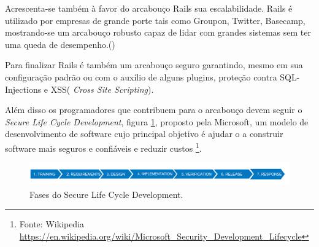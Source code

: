 \par Acrescenta-se também à favor do arcabouço Rails sua escalabilidade. Rails é utilizado por empresas de grande porte tais como Groupon, Twitter, Basecamp, mostrando-se um arcabouço robusto capaz de lidar com grandes sistemas sem ter uma queda de desempenho.(\cite{lilia:16})
\par Para finalizar Rails é também um arcabouço seguro garantindo, mesmo em sua configuração padrão ou com o auxílio de alguns plugins, proteção contra SQL-Injections e XSS( \emph{Cross Site Scripting}).
\par Além disso os programadores que contribuem para o arcabouço devem seguir o \emph{Secure Life Cycle Development}, figura \ref{fig:security_dev_lifecycle}, proposto pela Microsoft, um modelo de desenvolvimento de software cujo principal objetivo é ajudar o a construir software mais seguros e confiáveis e reduzir custos \footnote{Fonte: Wikipedia \url{https://en.wikipedia.org/wiki/Microsoft_Security_Development_Lifecycle}}.
\begin{figure}[htb]
\includegraphics[width=15cm]{figuras/security_dev_lifecycle}
\caption{\label{fig:security_dev_lifecycle} Fases do Secure Life Cycle Development.}
\end{figure}
